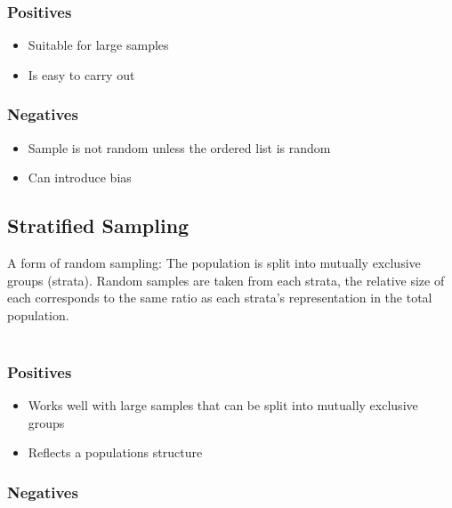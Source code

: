 \documentclass{article}
\begin{document}
\subsubsection{Positives}
    
\begin{itemize}

    \item Suitable for large samples 
    \item Is easy to carry out

\end{itemize}

\subsubsection{Negatives}

\begin{itemize}

    \item Sample is not random unless the ordered list is random 
    \item Can introduce bias
    
\end{itemize}

\subsection{Stratified Sampling}

A form of random sampling: The population is split into mutually exclusive
groups (strata). Random samples are taken from each strata, the relative size of
each corresponds to the same ratio as each strata's representation in the total
population. \\\\

\subsubsection{Positives}

\begin{itemize}

    \item Works well with large samples that can be split into mutually
        exclusive groups 
    \item Reflects a populations structure
    
\end{itemize}

\subsubsection{Negatives}
\end{document}
